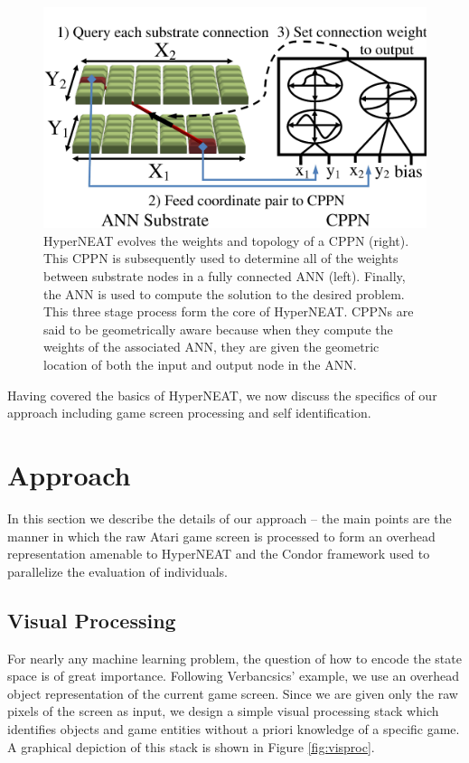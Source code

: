 \documentclass{acm_proc_article-sp}
\begin{document}
\begin{figure}[htp]
\begin{center}
\includegraphics[width=\columnwidth]{figures/cppn}
\end{center}
\caption{HyperNEAT evolves the weights and topology of a CPPN (right). This CPPN is subsequently used to determine all of the weights between substrate nodes in a fully connected ANN (left). Finally, the ANN is used to compute the solution to the desired problem. This three stage process form the core of HyperNEAT. CPPNs are said to be geometrically aware because when they compute the weights of the associated ANN, they are given the geometric location of both the input and output node in the ANN.}
\label{fig:cppn}
\end{figure}

Having covered the basics of HyperNEAT, we now discuss the specifics of our approach including game screen processing and self identification.


\section{Approach}
\label{sec:approach}
In this section we describe the details of our approach -- the main points are the manner in which the raw Atari game screen is processed to form an overhead representation amenable to HyperNEAT and the Condor framework used to parallelize the evaluation of individuals.

\subsection{Visual Processing}
For nearly any machine learning problem, the question of how to encode the state space is of great importance. Following Verbancsics' example, we use an overhead object representation of the current game screen. Since we are given only the raw pixels of the screen as input, we design a simple visual processing stack which identifies objects and game entities without a priori knowledge of a specific game. A graphical depiction of this stack is shown in Figure \ref{fig:visproc}.
\end{document}
